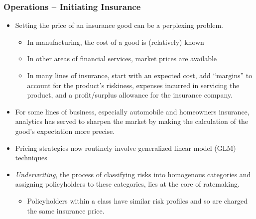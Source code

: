\documentclass[serif,10pt]{beamer}
\begin{document}
\begin{frame}[shrink=2]
\frametitle{Operations -- Initiating Insurance}
  \begin{itemize}
\item Setting the price of an insurance good can be a perplexing problem.
  \begin{itemize}
\item In manufacturing, the cost of a good is (relatively) known
\item In other areas of financial services, market prices are available
\item In many lines of insurance, start with an expected cost, add ``margins'' to account for the product's riskiness, expenses incurred in servicing the product, and a profit/surplus allowance for the insurance company.
\end{itemize} \pause
\item For some lines of business, especially automobile and homeowners insurance, analytics has served to sharpen the market by making the calculation of the good's expectation more precise.
\item Pricing strategies now routinely involve generalized linear model (GLM) techniques
\item \textit{Underwriting}, the process of classifying risks into homogenous categories and assigning policyholders to these categories, lies at the core of ratemaking.  \begin{itemize}
\item Policyholders within a class have similar risk profiles and so are charged the same insurance price.
\end{itemize}\end{itemize}
\end{frame}
\end{document}
